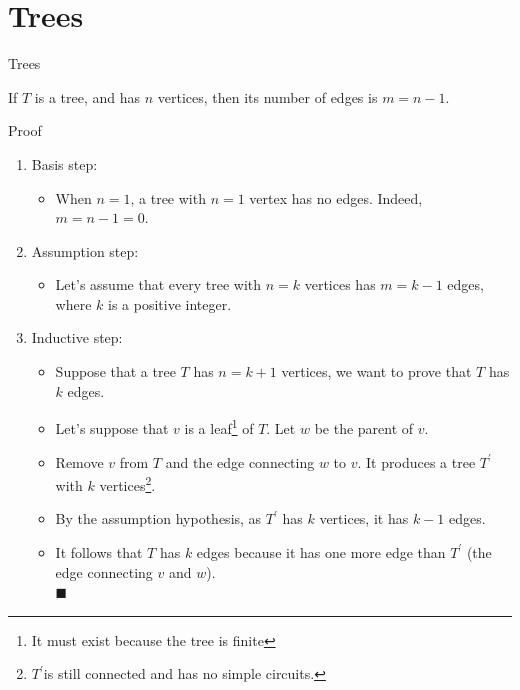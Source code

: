 \documentclass{beamer}
\theoremstyle{definition}
\begin{document}
\section{Trees}

\begin{frame}{Trees}
    \begin{lemma}
      If $T$ is a tree, and has $n$ vertices, then its number of edges is $m = n - 1$.
      \let\thefootnote\relax{}
    \end{lemma}
\end{frame}

\begin{frame}{Proof}
  \small
    \begin{enumerate}[<+->]
        \item Basis step: 
          \begin{itemize}
            \scriptsize
            \item When $n = 1$, a tree with $n = 1$ vertex has no edges.  Indeed, $m = n - 1 = 0$.
        \end{itemize}
        \item Assumption step:
        \begin{itemize}
            \scriptsize
            \item Let's assume that every tree with $n = k$ vertices has $m = k - 1$ edges, where $k$ is a positive integer.
        \end{itemize}
        \item Inductive step: 
        \begin{itemize}
          \scriptsize
          \item Suppose that a tree $T$ has $n = k + 1$ vertices, we want to prove that $T$ has $k$ edges.
          \item Let's suppose that $v$ is a leaf\footnote{{\tiny It must exist because the tree is finite}} of $T$.  Let $w$ be the parent of $v$. 
          \item Remove $v$ from $T$ and the edge connecting $w$ to $v$. It produces a tree $T^\prime$ with $k$ vertices\footnote{ {\tiny $T^\prime$is still connected and has no simple circuits.}}. 
          \item By the assumption hypothesis, as $T^\prime$ has $k$ vertices, it has $k - 1$ edges.
          \item It follows that $T$ has $k$ edges because it has one more edge than $T^\prime$ (the edge connecting $v$ and $w$). \\ \hspace{10cm} {\tiny $\blacksquare$}
        \end{itemize}
    \end{enumerate}
\end{frame}
\end{document}
